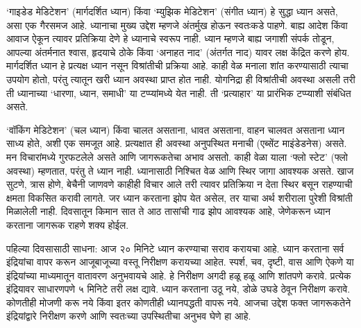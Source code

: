 ‘गाइडेड मेडिटेशन’ (मार्गदर्शित ध्यान) किंवा ‘म्युझिक मेडिटेशन’ (संगीत ध्यान) हे सुद्धा ध्यान असते, असा एक गैरसमज आहे. ध्यानाचा मुख्य उद्देश म्हणजे अंतर्मुख होऊन स्वतःकडे पाहणे. बाह्य आदेश किंवा आवाज ऐकून त्यावर प्रतिक्रिया देणे हे ध्यानाचे स्वरूप नाही. ध्यान म्हणजे बाह्य जगाशी संपर्क तोडून, आपल्या अंतर्मनात श्वास, हृदयाचे ठोके किंवा ‘अनाहत नाद’ (अंतर्गत नाद) यावर लक्ष केंद्रित करणे होय. मार्गदर्शित ध्यान हे प्रत्यक्ष ध्यान नसून विश्रांतीची प्रक्रिया आहे. काही वेळ मनाला शांत करण्यासाठी त्याचा उपयोग होतो, परंतु त्यातून खरी ध्यान अवस्था प्राप्त होत नाही. योगनिद्रा ही विश्रांतीची अवस्था असली तरी ती ध्यानाच्या ‘धारणा, ध्यान, समाधी’ या टप्प्यांमध्ये येत नाही. ती ‘प्रत्याहार’ या प्रारंभिक टप्प्याशी संबंधित असते.

‘वॉकिंग मेडिटेशन’ (चल ध्यान) किंवा चालत असताना, धावत असताना, वाहन चालवत असताना ध्यान साध्य होते, अशी एक समजूत आहे. प्रत्यक्षात ही अवस्था अनुपस्थित मनाची (एब्सेंट माइंडेडनेस) असते. मन विचारांमध्ये गुरफटलेले असते आणि जागरूकतेचा अभाव असतो. काही वेळा याला ‘फ्लो स्टेट’ (फ्लो अवस्था) म्हणतात, परंतु ते ध्यान नाही. ध्यानासाठी निश्चित वेळ आणि स्थिर जागा आवश्यक असते. खाज सुटणे, त्रास होणे, बेचैनी जाणवणे काहीही विचार आले तरी त्यावर प्रतिक्रिया न देता स्थिर बसून राहण्याची क्षमता विकसित करावी लागते. जर ध्यान करताना झोप येत असेल, तर याचा अर्थ शरीराला पुरेशी विश्रांती मिळालेली नाही. दिवसातून किमान सात ते आठ तासांची गाढ झोप आवश्यक आहे, जेणेकरून ध्यान करताना जागरूक राहणे शक्य होईल.

पहिल्या दिवसासाठी साधना: आज २० मिनिटे ध्यान करण्याचा सराव करायचा आहे. ध्यान करताना सर्व इंद्रियांचा वापर करून आजूबाजूच्या वस्तू निरीक्षण करायच्या आहेत.  स्पर्श, चव, दृष्टी, वास आणि ऐकणे या इंद्रियांच्या माध्यमातून वातावरण अनुभवायचे आहे. हे निरीक्षण अगदी हळू हळू आणि शांतपणे करावे. प्रत्येक इंद्रियावर साधारणपणे ५ मिनिटे तरी लक्ष द्यावे. ध्यान करताना उठू नये, डोळे उघडे ठेवून निरीक्षण करावे. कोणतीही मोजणी करू नये किंवा इतर कोणतीही ध्यानपद्धती वापरू नये. आजचा उद्देश फक्त जागरूकतेने इंद्रियांद्वारे निरीक्षण करणे आणि स्वतःच्या उपस्थितीचा अनुभव घेणे हा आहे.

